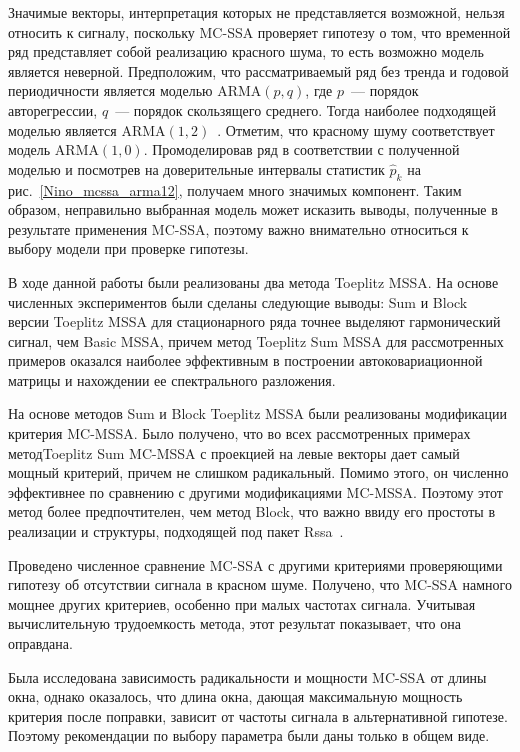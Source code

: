 \documentclass[specialist,
substylefile = spbu.rtx,
               subf,href,colorlinks=true, 12pt]{disser}
\theoremstyle{definition}
\begin{document}
Значимые векторы, интерпретация которых не представляется возможной, нельзя относить к сигналу, поскольку MC-SSA проверяет гипотезу о том, что временной ряд представляет собой реализацию красного шума, то есть возможно модель является неверной. Предположим, что рассматриваемый ряд без тренда и годовой периодичности является моделью ARMA$(p, q)$, где $p$~--- порядок авторегрессии, $q$~--- порядок скользящего среднего. Тогда наиболее подходящей моделью является ARMA$(1, 2)$~\cite{Hyndman2008}. Отметим, что красному шуму соответствует модель ARMA$(1, 0)$. Промоделировав ряд в соответствии с полученной моделью и посмотрев на доверительные интервалы статистик $\hat p_k$ на рис.~\ref{Nino_mcssa_arma12}, получаем много значимых компонент. Таким образом, неправильно выбранная модель может исказить выводы, полученные в результате применения MC-SSA, поэтому важно внимательно относиться к выбору модели при проверке гипотезы.

\conclusion
В ходе данной работы были реализованы два метода Toeplitz MSSA. На основе численных экспериментов были сделаны следующие выводы: Sum и Block версии Toeplitz MSSA для стационарного ряда точнее выделяют гармонический сигнал, чем Basic MSSA, причем метод Toeplitz Sum MSSA для рассмотренных примеров оказался наиболее эффективным в построении автоковариационной матрицы и нахождении ее спектрального разложения.

На основе методов Sum и Block Toeplitz MSSA были реализованы модификации критерия MC-MSSA. Было получено, что во всех рассмотренных примерах метод\linebreak Toeplitz Sum MC-MSSA с проекцией на левые векторы дает самый мощный критерий, причем не слишком радикальный. Помимо этого, он численно эффективнее по сравнению с другими модификациями MC-MSSA. Поэтому этот метод более предпочтителен, чем метод Block, что важно ввиду его простоты в реализации и структуры, подходящей под пакет \textsf{Rssa}~\cite{Rssa}.

Проведено численное сравнение MC-SSA с другими критериями проверяющими гипотезу об отсутствии сигнала в красном шуме. Получено, что MC-SSA намного мощнее других критериев, особенно при малых частотах сигнала. Учитывая вычислительную трудоемкость метода, этот результат показывает, что она оправдана.

Была исследована зависимость радикальности и мощности MC-SSA от длины окна, однако оказалось, что длина окна, дающая максимальную мощность критерия после поправки, зависит от частоты сигнала в альтернативной гипотезе. Поэтому рекомендации по выбору параметра были даны только в общем виде.
\end{document}
